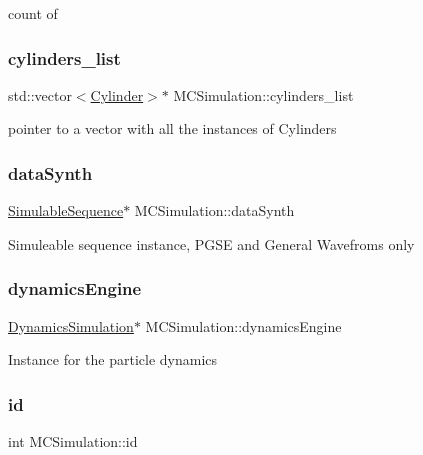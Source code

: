 count of \mbox{\label{class_m_c_simulation_a36909899f67439feed1a980037ea8c03}} 
\subsubsection{\texorpdfstring{cylinders\+\_\+list}{cylinders\_list}}
{\footnotesize\ttfamily std\+::vector$<$\hyperlink{class_cylinder}{Cylinder}$>$$\ast$ M\+C\+Simulation\+::cylinders\+\_\+list}

pointer to a vector with all the instances of Cylinders \mbox{\label{class_m_c_simulation_a7e2496127af6436d64bca7f52bc40c82}} 
\subsubsection{\texorpdfstring{data\+Synth}{dataSynth}}
{\footnotesize\ttfamily \hyperlink{class_simulable_sequence}{Simulable\+Sequence}$\ast$ M\+C\+Simulation\+::data\+Synth}

Simuleable sequence instance, P\+G\+SE and General Wavefroms only \mbox{\label{class_m_c_simulation_ac453455b2dfb994b7b1a4b7823bd3dc9}} 
\subsubsection{\texorpdfstring{dynamics\+Engine}{dynamicsEngine}}
{\footnotesize\ttfamily \hyperlink{class_dynamics_simulation}{Dynamics\+Simulation}$\ast$ M\+C\+Simulation\+::dynamics\+Engine}

Instance for the particle dynamics \mbox{\label{class_m_c_simulation_aff828a83a905ae188146d3ffaa12a1bc}} 
\subsubsection{\texorpdfstring{id}{id}}
{\footnotesize\ttfamily int M\+C\+Simulation\+::id}

